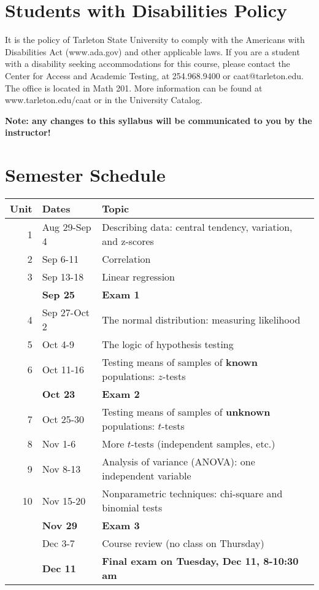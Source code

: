 \documentclass[10pt]{article}
\begin{document}
\section*{Students with Disabilities Policy}
\label{sec:orgee2ed42}

It is the policy of Tarleton State University to comply with the Americans with Disabilities  Act (www.ada.gov) and other applicable laws.  If you are a student with a disability seeking accommodations for this course, please contact the Center for Access and Academic Testing, at 254.968.9400 or caat@tarleton.edu. The office is located in Math 201. More information can be found at www.tarleton.edu/caat or in the University Catalog.​

\textbf{Note:  any changes to this syllabus will be communicated to you by the instructor!}

\section*{Semester Schedule}
\label{sec:org2f64c0d}
\begin{center}
\begin{tabular}{rll}
Unit & Dates & Topic\\
\hline
1 & Aug 29-Sep 4 & Describing data: central tendency, variation, and z-scores\\
2 & Sep 6-11 & Correlation\\
3 & Sep 13-18 & Linear regression\\
 & \textbf{Sep 25} & \textbf{Exam 1}\\
4 & Sep 27-Oct 2 & The normal distribution: measuring likelihood\\
5 & Oct 4-9 & The logic of hypothesis testing\\
6 & Oct 11-16 & Testing means of samples of \textbf{known} populations: \(z\)-tests\\
 & \textbf{Oct 23} & \textbf{Exam 2}\\
7 & Oct 25-30 & Testing means of samples of \textbf{unknown} populations: \(t\)-tests\\
8 & Nov 1-6 & More \(t\)-tests (independent samples, etc.)\\
9 & Nov 8-13 & Analysis of variance (ANOVA): one independent variable\\
10 & Nov 15-20 & Nonparametric techniques: chi-square and binomial tests\\
 & \textbf{Nov 29} & \textbf{Exam 3}\\
 & Dec 3-7 & Course review (no class on Thursday)\\
 & \textbf{Dec 11} & \textbf{Final exam on Tuesday, Dec 11, 8-10:30 am}\\
\end{tabular}
\end{center}
\end{document}
